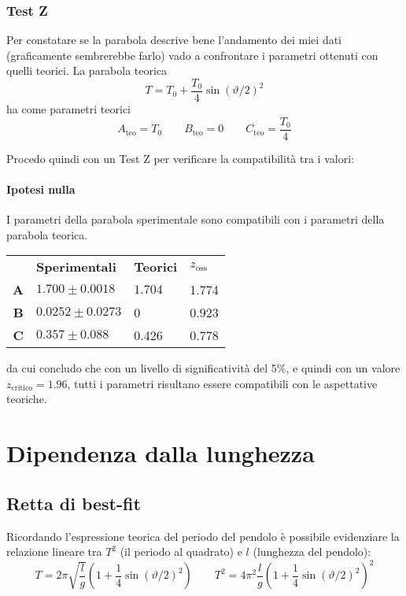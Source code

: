 \documentclass{article}
\begin{document}
\subsubsection{Test Z}
Per constatare se la parabola descrive bene l'andamento dei miei dati (graficamente sembrerebbe farlo) vado a confrontare i parametri ottenuti con quelli teorici. La parabola teorica 
\[
T = T_0 + \frac{T_0}{4}\sin{(\vartheta/2)}^2
\]
ha come parametri teorici
\[
A_\text{teo} = T_0 \qquad B_\text{teo} = 0 \qquad C_\text{teo} =  \frac{T_0}{4} 
\]

\noindent
Procedo quindi con un Test Z per verificare la compatibilità tra i valori:

\paragraph{Ipotesi nulla} I parametri della parabola sperimentale sono compatibili con i parametri della parabola teorica.

\begin{table}[H]
	\centering
	\begin{tabular}{@{}rp{3cm}p{2cm}p{2cm}@{}}
		
		&\textbf{Sperimentali} & \textbf{Teorici} & $z_{\text{oss}}$ \\ \cmidrule(r){2-4}
		\textbf{A}&$1.700 \pm 0.0018 $		& $1.704$	& 1.774 \\
		\textbf{B}&$0.0252 \pm  0.0273$		& 0 		& 0.923 \\
		\textbf{C}&$0.357 \pm 0.088$		& 0.426 	& 0.778 \\ \cmidrule(r){2-4}
	\end{tabular}
\end{table}

da cui concludo che con un livello di significatività del 5\%, e quindi con un valore $z_{\text{critico}} = 1.96$, tutti i parametri risultano essere compatibili con le aspettative teoriche.


\newpage
\section{Dipendenza dalla lunghezza}

\subsection{Retta di best-fit}
Ricordando l'espressione teorica del periodo del pendolo è possibile evidenziare la relazione lineare tra $T^2$ (il periodo al quadrato) e  $l$ (lunghezza del pendolo):
\[
T = 2\pi \sqrt{\frac{l}{g}} \left( 1 + \frac{1}{4}\sin{\left(\vartheta/2\right)}^2 \right) \qquad T^2 = 4 \pi^2 \frac{l}{g} \left( 1 + \frac{1}{4}\sin{\left(\vartheta/2\right)}^2 \right)^2
\]
\end{document}
